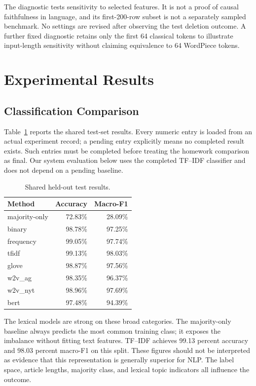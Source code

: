 \documentclass[11pt]{article}
\begin{document}
The diagnostic tests sensitivity to selected features. It is not a proof of causal faithfulness in language, and its first-200-row subset is not a separately sampled benchmark. No settings are revised after observing the test deletion outcome. A further fixed diagnostic retains only the first 64 classical tokens to illustrate input-length sensitivity without claiming equivalence to 64 WordPiece tokens.
\clearpage
\section{Experimental Results}
\subsection{Classification Comparison}
Table~\ref{tab:main} reports the shared test-set results. Every numeric entry is loaded from an actual experiment record; a pending entry explicitly means no completed result exists. Such entries must be completed before treating the homework comparison as final. Our system evaluation below uses the completed TF--IDF classifier and does not depend on a pending baseline.
\begin{table}[h]\centering\small
\begin{tabular}{lrr}\toprule
Method & Accuracy & Macro-F1\\\midrule
majority-only & 72.83\% & 28.09\% \\
binary & 98.78\% & 97.25\% \\
frequency & 99.05\% & 97.74\% \\
tfidf & 99.13\% & 98.03\% \\
glove & 98.87\% & 97.56\% \\
w2v\_ag & 98.35\% & 96.37\% \\
w2v\_nyt & 98.96\% & 97.69\% \\
bert & 97.48\% & 94.39\% \\
\bottomrule\end{tabular}
\caption{Shared held-out test results.}\label{tab:main}
\end{table}

The lexical models are strong on these broad categories. The majority-only baseline always predicts the most common training class; it exposes the imbalance without fitting text features. TF--IDF achieves 99.13 percent accuracy and 98.03 percent macro-F1 on this split. These figures should not be interpreted as evidence that this representation is generally superior for NLP. The label space, article lengths, majority class, and lexical topic indicators all influence the outcome.
\end{document}
